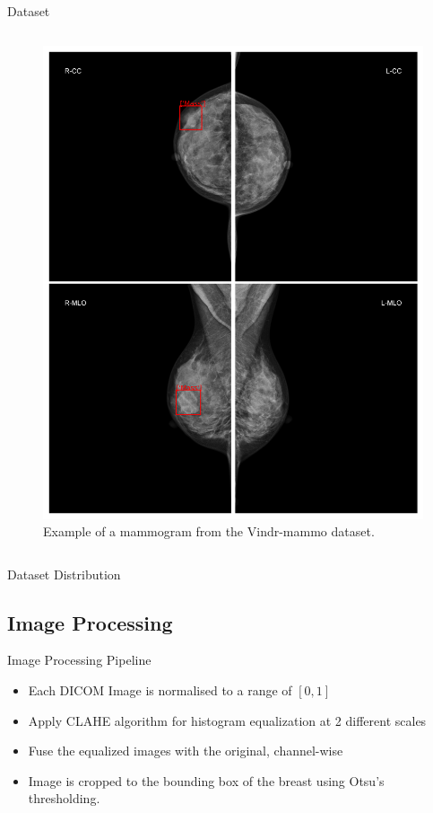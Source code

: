 \begin{frame}{Dataset}
\begin{columns}
        \begin{column}{0.5\textwidth}
            \begin{figure}
                \centering
                \includegraphics[height=0.7\textheight,keepaspectratio]{imagenes/vista_vindr.png}
                \caption{Example of a mammogram from the Vindr-mammo dataset.}
            \end{figure}
        \end{column}
    \end{columns}
\end{frame}

\begin{frame}{Dataset Distribution}
    
\end{frame}

\subsection{Image Processing}
\begin{frame}{Image Processing Pipeline}
    \begin{itemize}
        \item Each DICOM Image is normalised to a range of $[0, 1]$
        \item Apply CLAHE algorithm  for histogram equalization at 2 different scales
        \item Fuse the equalized images with the original, channel-wise
        \item Image is cropped to the bounding box of the breast using Otsu's thresholding.
    \end{itemize}
\end{frame}

